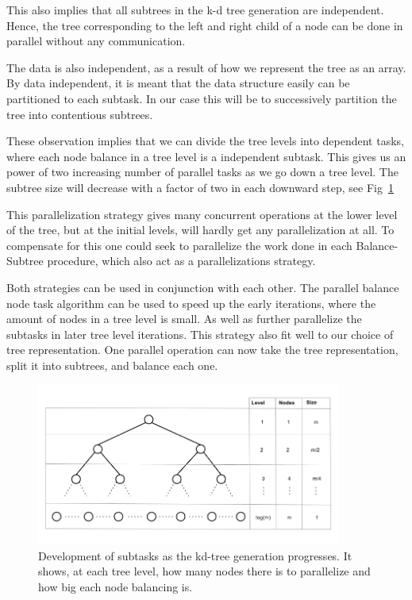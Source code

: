 This also implies that all subtrees in the k-d tree generation are independent. Hence, the tree corresponding to the left and right child of a node can be done in parallel without any communication. 

The data is also independent, as a result of how we represent the tree as an array. By data independent, it is meant that the data structure easily can be partitioned to each subtask. In our case this will be to successively partition the tree into contentious subtrees.

These observation implies that we can divide the tree levels into dependent tasks, where each node balance in a tree level is a independent subtask. This gives us an power of two increasing number of parallel tasks as we go down a tree level. The subtree size will decrease with a factor of two in each downward step, see Fig~\ref{fig:tree_level_development}

This parallelization strategy gives many concurrent operations at the lower level of the tree, but at the initial levels, will hardly get any parallelization at all. To compensate for this one could seek to parallelize the work done in each Balance-Subtree procedure, which also act as a parallelizations strategy.

Both strategies can be used in conjunction with each other. The parallel balance node task algorithm can be used to speed up the early iterations, where the amount of nodes in a tree level is small. As well as further parallelize the subtasks in later tree level iterations. This strategy also fit well to our choice of tree representation. One parallel operation can now take the tree representation, split it into subtrees, and balance each one. 

\begin{figure}[ht!]
\centering
\includegraphics[width=100mm]{../gfx/Tree_level_development.png}

\caption{Development of subtasks as the kd-tree generation progresses. It shows, at each tree level, how many nodes there is to parallelize and how big each node balancing is.}
\label{fig:tree_level_development}
\end{figure}

